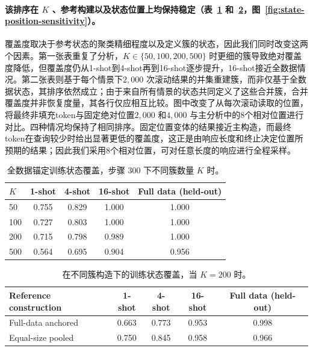 \paragraph{该排序在 \(K\) 、参考构建以及状态位置上均保持稳定（表~\ref{tab:coverage-k} 和~\ref{tab:coverage-reference}，图~\ref{fig:state-position-sensitivity}）。}
覆盖度取决于参考状态的聚类精细程度以及定义簇的状态，因此我们同时改变这两个因素。第一张表重复了分析，\(K\in\{50,100,200,500\}\) 时更细的簇导致绝对覆盖度降低，但覆盖度仍从1-shot到4-shot再到16-shot逐步提升，16-shot接近全数据情况。第二张表则基于每个情景下\(2{,}000\) 次滚动结果的并集重建簇，而非仅基于全数据状态，其排序依然成立；由于来自所有情景的状态共同定义了这些合并簇，合并覆盖度并非恢复度量，其各行仅应相互比较。图中改变了从每次滚动读取的位置，将最终非填充token与固定绝对位置\(2{,}000\) 和\(4{,}000\) 与主分析中的8个相对位置进行对比。四种情况均保持了相同排序。固定位置变体的结果接近主构造，而最终token在查询较少时给出显著更低的覆盖度，这正是由响应长度和终止决定位置所预期的结果；因此我们采用8个相对位置，可对任意长度的响应进行全程采样。

\begin{table}[t]
    \centering
    \small
    \caption{全数据锚定训练状态覆盖，步骤 \(300\)  下不同簇数量 \(K\)  时。}
    \label{tab:coverage-k}
    \begin{tabular}{lcccc}
        \toprule
        \(K\)
        & 1-shot
        & 4-shot
        & 16-shot
        & Full data (held-out) \\
        \midrule
        50  & 0.755 & 0.829 & 1.000 & 1.000 \\
        100 & 0.727 & 0.803 & 1.000 & 1.000 \\
        200 & 0.715 & 0.798 & 0.989 & 1.000 \\
        500 & 0.564 & 0.695 & 0.904 & 0.956 \\
        \bottomrule
    \end{tabular}
\end{table}

\begin{table}[t]
    \centering
    \small
    \caption{在不同簇构造下的训练状态覆盖，当 \(K=200\) 时。}
    \label{tab:coverage-reference}
    \begin{tabular}{lcccc}
        \toprule
        Reference construction
        & 1-shot
        & 4-shot
        & 16-shot
        & Full data (held-out) \\
        \midrule
        Full-data anchored
        & 0.663 & 0.773 & 0.953 & 0.998 \\
        Equal-size pooled
        & 0.750 & 0.845 & 0.958 & 0.966 \\
        \bottomrule
    \end{tabular}
\end{table}

